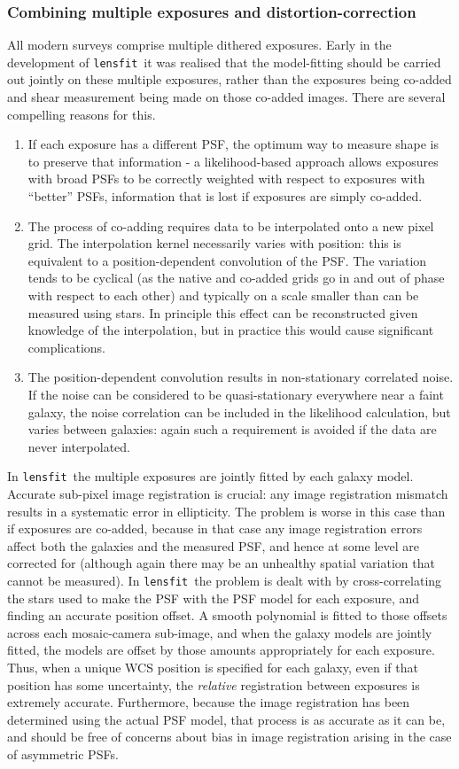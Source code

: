\documentclass{article}
\def\lensfit{{\tt lensfit}\ }
\begin{document}
\subsubsection{Combining multiple exposures and distortion-correction}
All modern surveys comprise multiple dithered exposures.  Early in the development of \lensfit it
was realised that the model-fitting should be carried out jointly on these multiple exposures,
rather than the exposures being co-added and shear measurement being made on those co-added images.  There
are several compelling reasons for this.
\begin{enumerate}
\item If each exposure has a different PSF, the optimum way to measure shape is to preserve that
information - a likelihood-based approach allows exposures with broad PSFs to be correctly weighted
with respect to exposures with ``better'' PSFs, information that is lost if exposures are simply co-added.
\item The process of co-adding requires data to be interpolated onto a new pixel grid.  The 
interpolation kernel necessarily varies with position: this is equivalent to a position-dependent
convolution of the PSF.  The variation tends to be cyclical (as the native and co-added grids go in
and out of phase with respect to each other) and typically on a scale smaller than can be 
measured using stars.  In principle this effect can be reconstructed given knowledge of the 
interpolation, but in practice this would cause significant complications.
\item The position-dependent convolution results in non-stationary correlated noise.  If the noise
can be considered to be quasi-stationary everywhere near a faint galaxy, the noise correlation can
be included in the likelihood calculation, but varies between galaxies: 
again such a requirement is avoided if the data are
never interpolated.
\end{enumerate}
In \lensfit the multiple exposures are jointly fitted by each galaxy model.  Accurate sub-pixel
image registration is crucial: any image registration mismatch results in a systematic error in
ellipticity.  The problem is worse in this case than if exposures are co-added, because in that case
any image registration errors affect both the galaxies and the measured PSF, and hence at some level
are corrected for (although again there may be an unhealthy spatial variation that cannot be
measured).  In \lensfit the problem is dealt with by cross-correlating the stars used to make the PSF
with the PSF model for each exposure, and finding an accurate position offset.  A smooth polynomial
is fitted to those offsets across each mosaic-camera sub-image, and when the galaxy models are jointly
fitted, the models are offset by those amounts appropriately for each exposure.  Thus, when a 
unique WCS position is specified for each galaxy, even if that position has some uncertainty, the
{\em relative} registration between exposures is extremely accurate.  Furthermore, because the 
image registration has been determined using the actual PSF model, that process is as accurate as it
can be, and should be free of concerns about bias in image registration arising in the case of
asymmetric PSFs.  
\end{document}
